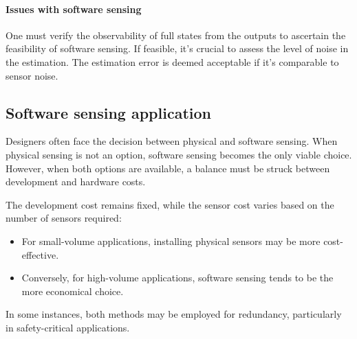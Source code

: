 \paragraph*{Issues with software sensing}
One must verify the observability of full states from the outputs to ascertain the feasibility of software sensing. 
If feasible, it's crucial to assess the level of noise in the estimation. 
The estimation error is deemed acceptable if it's comparable to sensor noise.

\subsection{Software sensing application}
Designers often face the decision between physical and software sensing. 
When physical sensing is not an option, software sensing becomes the only viable choice. 
However, when both options are available, a balance must be struck between development and hardware costs.

The development cost remains fixed, while the sensor cost varies based on the number of sensors required:
\begin{itemize}
    \item For small-volume applications, installing physical sensors may be more cost-effective.
    \item Conversely, for high-volume applications, software sensing tends to be the more economical choice.
\end{itemize}
In some instances, both methods may be employed for redundancy, particularly in safety-critical applications.